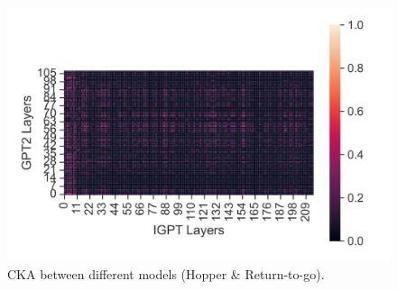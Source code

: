 \documentclass{article}
\begin{document}
\begin{figure}[H]
\begin{minipage}[b]{0.32\linewidth}
    \end{minipage}
    \begin{minipage}[b]{0.32\linewidth}
        \includegraphics[width=\linewidth]{figs/cka_40_40_gpt2igpt_hopper_medium_666_reward.png}
    \end{minipage}
    \caption{CKA between different models (Hopper \& Return-to-go).}
\end{figure}
\end{document}
